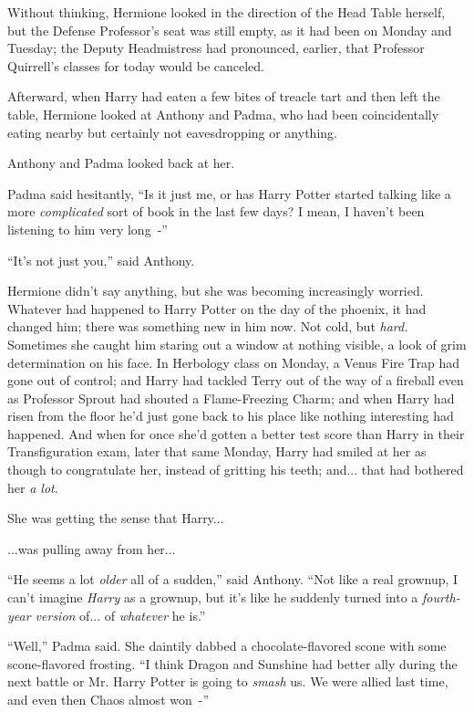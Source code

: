 Without thinking, Hermione looked in the direction of the Head Table herself, but the Defense Professor's seat was still empty, as it had been on Monday and Tuesday; the Deputy Headmistress had pronounced, earlier, that Professor Quirrell's classes for today would be canceled.

Afterward, when Harry had eaten a few bites of treacle tart and then left the table, Hermione looked at Anthony and Padma, who had been coincidentally eating nearby but certainly not eavesdropping or anything.

Anthony and Padma looked back at her.

Padma said hesitantly, ``Is it just me, or has Harry Potter started talking like a more \emph{complicated} sort of book in the last few days? I mean, I haven't been listening to him very long~-''

``It's not just you,'' said Anthony.

Hermione didn't say anything, but she was becoming increasingly worried. Whatever had happened to Harry Potter on the day of the phoenix, it had changed him; there was something new in him now. Not cold, but \emph{hard.} Sometimes she caught him staring out a window at nothing visible, a look of grim determination on his face. In Herbology class on Monday, a Venus Fire Trap had gone out of control; and Harry had tackled Terry out of the way of a fireball even as Professor Sprout had shouted a Flame-Freezing Charm; and when Harry had risen from the floor he'd just gone back to his place like nothing interesting had happened. And when for once she'd gotten a better test score than Harry in their Transfiguration exam, later that same Monday, Harry had smiled at her as though to congratulate her, instead of gritting his teeth; and... that had bothered her \emph{a lot}.

She was getting the sense that Harry...

...was pulling away from her...

``He seems a lot \emph{older} all of a sudden,'' said Anthony. ``Not like a real grownup, I can't imagine \emph{Harry} as a grownup, but it's like he suddenly turned into a \emph{fourth-year version} of... of \emph{whatever} he is.''

``Well,'' Padma said. She daintily dabbed a chocolate-flavored scone with some scone-flavored frosting. ``I think Dragon and Sunshine had better ally during the next battle or Mr. Harry Potter is going to \emph{smash} us. We were allied last time, and even then Chaos almost won~-''

